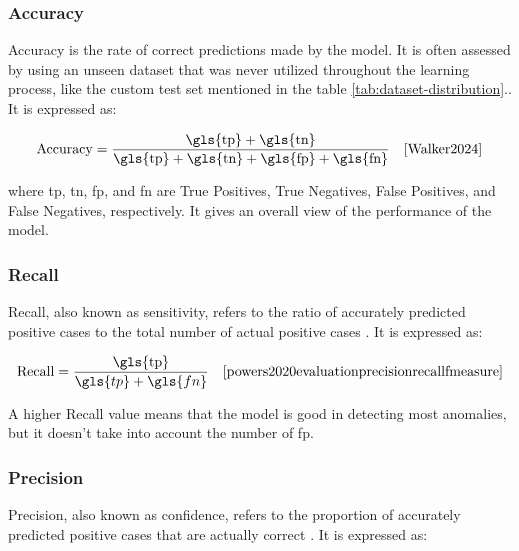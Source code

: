 \subsubsection*{Accuracy}
\label{subsec:Accuracy}

Accuracy is the rate of correct predictions made by the model. It is often assessed by using an unseen dataset that was never utilized throughout the learning process, like the custom test set mentioned in the table \ref{tab:dataset-distribution}.\cite{Kohavi1998}. It is expressed as: 

\begin{equation}
    \text{Accuracy} = \frac{\text{\gls{tp}} + \text{\gls{tn}}}{\text{\gls{tp}} + \text{\gls{tn}} + \text{\gls{fp}} + \text{\gls{fn}}} \quad \text{\cite{Walker2024}}
    \label{eq:accuracy}
\end{equation}

where \gls{tp}, \gls{tn}, \gls{fp}, and \gls{fn} are True Positives, True Negatives, False Positives, and False Negatives, respectively. It gives an overall view of the performance of the model.

\subsubsection*{Recall}
\label{subsec:Recall}

Recall, also known as sensitivity, refers to the ratio of accurately predicted positive cases to the total number of actual positive cases \cite{powers2020evaluationprecisionrecallfmeasure}. It is expressed as:

\begin{equation}
    \text{Recall} = \frac{\text{\gls{tp}}}{\gls{tp} + \gls{fn}} \quad \text{\cite{powers2020evaluationprecisionrecallfmeasure}}
    \label{eq:recall}
\end{equation}

A higher Recall value means that the model is good in detecting most anomalies, but it doesn't take into account the number of \gls{fp}.

\subsubsection*{Precision}
\label{subsec:Precision}

Precision, also known as confidence, refers to the proportion of accurately predicted positive cases that are actually correct \cite{powers2020evaluationprecisionrecallfmeasure}. It is expressed as:

